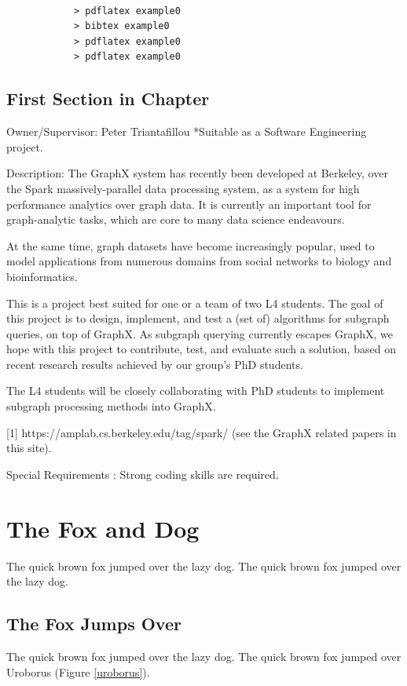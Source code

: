 \documentclass{l4proj}
\theoremstyle{definition}
\begin{document}
\begin{verbatim}

            > pdflatex example0
            > bibtex example0
            > pdflatex example0
            > pdflatex example0

\end{verbatim}


\section{First Section in Chapter}
Owner/Supervisor: Peter Triantafillou
*Suitable as a Software Engineering project.

Description: 
The GraphX system has recently been developed at Berkeley, over the Spark massively-parallel data processing system, as a system for high performance analytics over graph data. It is currently an important tool for graph-analytic tasks, which are core to many data science endeavours. 

At the same time, graph datasets have become increasingly popular, used to model applications from numerous domains from social networks to biology and bioinformatics. 

This is a project best suited for one or a team of two L4 students. 
The goal of this project is to design, implement, and test a (set of) algorithms for subgraph queries, on top of GraphX. As subgraph querying currently escapes GraphX, we hope with this project to contribute, test, and evaluate such a solution, based on recent research results achieved by our group's PhD students. 

The L4 students will be closely collaborating with PhD students to implement subgraph processing methods into GraphX. 

[1] https://amplab.cs.berkeley.edu/tag/spark/ 
(see the GraphX related papers in this site).

Special Requirements : 
Strong coding skills are required.

\chapter{The Fox and Dog}
The quick brown fox jumped over the lazy dog.
The quick brown fox jumped over the lazy dog.


\section{The Fox Jumps Over}
The quick brown fox jumped over the lazy dog.
The quick brown fox jumped over Uroborus (Figure \ref{uroborus}).
\end{document}
